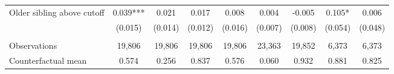 {{\begin{tabular}{lcccccccc}
Older sibling above cutoff&       0.039***&       0.021   &       0.017   &       0.008   &       0.004   &      -0.005   &       0.105*  &       0.006   \\
                    &     (0.015)   &     (0.014)   &     (0.012)   &     (0.016)   &     (0.007)   &     (0.008)   &     (0.054)   &     (0.048)   \\
                    &               &               &               &               &               &               &               &               \\
Observations        &      19,806   &      19,806   &      19,806   &      19,806   &      23,363   &      19,852   &       6,373   &       6,373   \\
Counterfactual mean &       0.574   &       0.256   &       0.837   &       0.576   &       0.060   &       0.932   &       0.881   &       0.825   \\
 

\bottomrule
\end{tabular}
}
}
